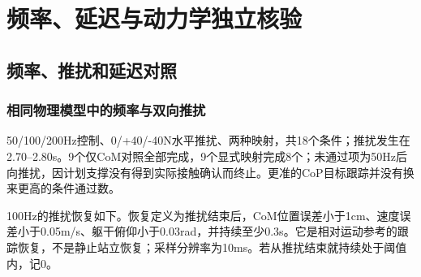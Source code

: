 

\FloatBarrier

\section{频率、延迟与动力学独立核验}

\label{stage:s24}

\subsection{频率、推扰和延迟对照}\label{s24-detail-1}

\subsubsection{相同物理模型中的频率与双向推扰}\label{s24-detail-2}

50/100/200Hz控制、0/+40/-40N水平推扰、两种映射，共18个条件；推扰发生在2.70--2.80s。9个仅CoM对照全部完成，9个显式映射完成8个；未通过项为50Hz后向推扰，因计划支撑没有得到实际接触确认而终止。更准的CoP目标跟踪并没有换来更高的条件通过数。

100Hz的推扰恢复如下。恢复定义为推扰结束后，CoM位置误差小于1cm、速度误差小于0.05m/s、躯干俯仰小于0.03rad，并持续至少0.3s。它是相对运动参考的跟踪恢复，不是静止站立恢复；采样分辨率为10ms。若从推扰结束就持续处于阈值内，记0。

